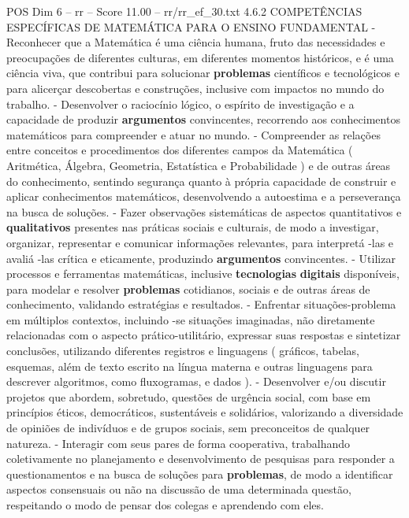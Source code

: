 \begin{textsample}{POS Dim 6 – rr – Score 11.00 – rr/rr\_ef\_30.txt}  \label{ex:f6_pos_213}
4.6.2 COMPETÊNCIAS ESPECÍFICAS DE MATEMÁTICA PARA O ENSINO FUNDAMENTAL - Reconhecer que a Matemática é uma ciência humana, fruto das necessidades e preocupações de diferentes culturas, em diferentes momentos históricos, e é uma ciência viva, que contribui para solucionar \textbf{problemas} científicos e tecnológicos e para alicerçar descobertas e construções, inclusive com impactos no mundo do trabalho. - Desenvolver o raciocínio lógico, o espírito de investigação e a capacidade de produzir \textbf{argumentos} convincentes, recorrendo aos conhecimentos matemáticos para compreender e atuar no mundo. - Compreender as relações entre conceitos e procedimentos dos diferentes campos da Matemática ( Aritmética, Álgebra, Geometria, Estatística e Probabilidade ) e de outras áreas do conhecimento, sentindo segurança quanto à própria capacidade de construir e aplicar conhecimentos matemáticos, desenvolvendo a autoestima e a perseverança na busca de soluções. - Fazer observações sistemáticas de aspectos quantitativos e \textbf{qualitativos} presentes nas práticas sociais e culturais, de modo a investigar, organizar, representar e comunicar informações relevantes, para interpretá -las e avaliá -las crítica e eticamente, produzindo \textbf{argumentos} convincentes. - Utilizar processos e ferramentas matemáticas, inclusive \textbf{tecnologias} \textbf{digitais} disponíveis, para modelar e resolver \textbf{problemas} cotidianos, sociais e de outras áreas de conhecimento, validando estratégias e resultados. - Enfrentar situações-problema em múltiplos contextos, incluindo -se situações imaginadas, não diretamente relacionadas com o aspecto prático-utilitário, expressar suas respostas e sintetizar conclusões, utilizando diferentes registros e linguagens ( gráficos, tabelas, esquemas, além de texto escrito na língua materna e outras linguagens para descrever algoritmos, como fluxogramas, e dados ). - Desenvolver e/ou discutir projetos que abordem, sobretudo, questões de urgência social, com base em princípios éticos, democráticos, sustentáveis e solidários, valorizando a diversidade de opiniões de indivíduos e de grupos sociais, sem preconceitos de qualquer natureza. - Interagir com seus pares de forma cooperativa, trabalhando coletivamente no planejamento e desenvolvimento de pesquisas para responder a questionamentos e na busca de soluções para \textbf{problemas}, de modo a identificar aspectos consensuais ou não na discussão de uma determinada questão, respeitando o modo de pensar dos colegas e aprendendo com eles.

\end{textsample}
